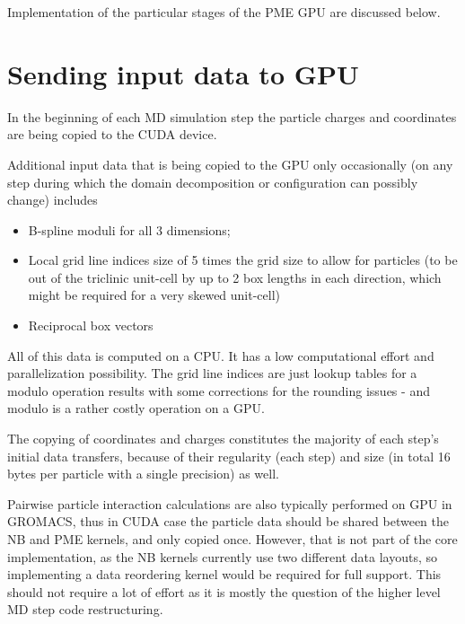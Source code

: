 \documentclass[12pt,a4paper]{report}
\newcommand{\draft}[1]{#1}
\begin{document}








Implementation of the particular stages of the PME GPU are discussed below.

\section{Sending input data to GPU}
In the beginning of each MD simulation step the particle charges and coordinates are being copied to the CUDA device.

Additional input data that is being copied to the GPU only occasionally (on any step during which the domain decomposition or configuration can possibly change) includes
\begin{itemize}
\item B-spline moduli for all 3 dimensions;
\item Local grid line indices size of 5 times the grid size to allow for particles (to be out of the triclinic unit-cell by up to 2 box lengths in each direction, which might be required for a very skewed unit-cell)
\item Reciprocal box vectors
\end{itemize}
All of this data is computed on a CPU. It has a low computational effort and parallelization possibility. The grid line indices are just lookup tables for a modulo operation results with some corrections for the rounding issues - and modulo is a rather costly operation on a GPU.

The copying of coordinates and charges constitutes the majority of each step's initial data transfers, because of their regularity (each step) and size (in total 16 bytes per particle with a single precision) as well.

Pairwise particle interaction calculations are also typically performed on GPU in GROMACS, thus in CUDA case the particle data should be shared between the NB and PME kernels, and only copied once. However, that is not part of the core implementation, as the NB kernels currently use two different data layouts, so implementing a data reordering kernel would be required for full support. This should not require a lot of effort as it is mostly the question of the higher level MD step code restructuring.
\end{document}
